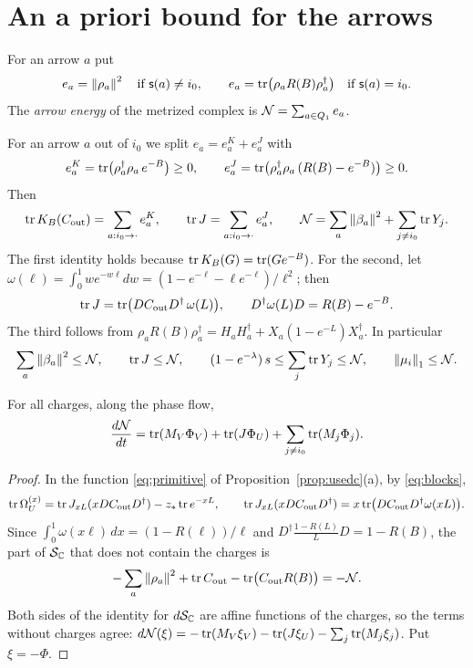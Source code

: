 \section{An a priori bound for the arrows}\label{sec:energy}

\begin{definition}\label{def:energy}
For an arrow $a$ put
\[
 e_a=\left\lVert\rho_a\right\rVert^2\quad\text{if }\mathsf s(a)\neq i_0,\qquad
 e_a=\operatorname{tr}\bigl(\rho_aR(B)\rho_a^\dagger\bigr)\quad\text{if }\mathsf s(a)=i_0 .
\]
The \emph{arrow energy} of the metrized complex is $\mathcal N=\sum_{a\in Q_1}e_a$.
\end{definition}

For an arrow $a$ out of $i_0$ we split $e_a=e_a^K+e_a^J$ with
\[
 e_a^K=\operatorname{tr}\bigl(\rho_a^\dagger\rho_a\,e^{-B}\bigr)\geq0,\qquad
 e_a^J=\operatorname{tr}\bigl(\rho_a^\dagger\rho_a\,(R(B)-e^{-B})\bigr)\geq0 .
\]
Then
\begin{equation}\label{eq:traces}
 \operatorname{tr} K_B(C_{\mathrm{out}})=\sum_{a:i_0\to\cdot}e_a^K,\qquad
 \operatorname{tr} J=\sum_{a:i_0\to\cdot}e_a^J,\qquad
 \mathcal N=\sum_a\left\lVert\beta_a\right\rVert^2+\sum_{j\neq i_0}\operatorname{tr} Y_j .
\end{equation}
The first identity holds because $\operatorname{tr} K_B(G)=\operatorname{tr}(Ge^{-B})$. For the second,
let $\omega(\ell)=\int_0^1we^{-w\ell}dw=(1-e^{-\ell}-\ell e^{-\ell})/\ell^2$;
then
\[
 \operatorname{tr} J=\operatorname{tr}\bigl(DC_{\mathrm{out}}D^\dagger\,\omega(L)\bigr),\qquad
 D^\dagger\omega(L)D=R(B)-e^{-B}.
\]
The third follows from
$\rho_aR(B)\rho_a^\dagger=H_aH_a^\dagger+X_a(1-e^{-L})X_a^\dagger$. In
particular
\begin{equation}\label{eq:energybounds}
 \sum_a\left\lVert\beta_a\right\rVert^2\leq\mathcal N,\qquad\operatorname{tr} J\leq\mathcal N,\qquad
 (1-e^{-\lambda})\,s\leq\sum_j\operatorname{tr} Y_j\leq\mathcal N,\qquad\left\lVert\mu_i\right\rVert_1\leq\mathcal N .
\end{equation}

\begin{lemma}\label{lem:energyderivative}
For all charges, along the phase flow,
\[
 \frac{d\mathcal N}{dt}=\operatorname{tr}(M_V\Phi_V)+\operatorname{tr}(J\Phi_U)+\sum_{j\neq i_0}\operatorname{tr}(M_j\Phi_j).
\]
\end{lemma}

\begin{proof}
In the function \eqref{eq:primitive} of Proposition~\ref{prop:usedc}(a), by
\eqref{eq:blocks},
\[
 \operatorname{tr}\Omega_U^{(x)}=\operatorname{tr} J_{xL}(xDC_{\mathrm{out}}D^\dagger)-z_\ast\operatorname{tr} e^{-xL},\qquad
 \operatorname{tr} J_{xL}(xDC_{\mathrm{out}}D^\dagger)=x\operatorname{tr}\bigl(DC_{\mathrm{out}}D^\dagger\omega(xL)\bigr).
\]
Since $\int_0^1\omega(x\ell)\,dx=(1-R(\ell))/\ell$ and
$D^\dagger\frac{1-R(L)}LD=1-R(B)$, the part of $\mathcal S_{\mathbb C}$ that does not
contain the charges is
\[
 -\sum_a\left\lVert\rho_a\right\rVert^2+\operatorname{tr} C_{\mathrm{out}}-\operatorname{tr}\bigl(C_{\mathrm{out}}R(B)\bigr)=-\mathcal N .
\]
Both sides of the identity for $d\mathcal S_{\mathbb C}$ are affine functions of the
charges, so the terms without charges agree:
$d\mathcal N(\xi)=-\operatorname{tr}(M_V\xi_V)-\operatorname{tr}(J\xi_U)-\sum_j\operatorname{tr}(M_j\xi_j)$. Put $\xi=-\Phi$.
\end{proof}

